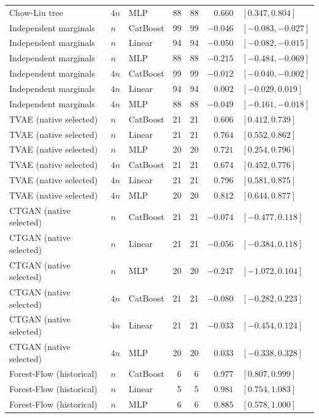 \begin{longtable}{@{}p{1.6in}llrrrl@{}}
Chow-Liu tree & $4n$ & MLP & 88 & 88 & $0.660$ & $[0.347, 0.804]$ \\
Independent marginals & $n$ & CatBoost & 99 & 99 & $-0.046$ & $[-0.083, -0.027]$ \\
Independent marginals & $n$ & Linear & 94 & 94 & $-0.050$ & $[-0.082, -0.015]$ \\
Independent marginals & $n$ & MLP & 88 & 88 & $-0.215$ & $[-0.484, -0.069]$ \\
Independent marginals & $4n$ & CatBoost & 99 & 99 & $-0.012$ & $[-0.040, -0.002]$ \\
Independent marginals & $4n$ & Linear & 94 & 94 & $0.002$ & $[-0.029, 0.019]$ \\
Independent marginals & $4n$ & MLP & 88 & 88 & $-0.049$ & $[-0.161, -0.018]$ \\
TVAE (native selected) & $n$ & CatBoost & 21 & 21 & $0.606$ & $[0.412, 0.739]$ \\
TVAE (native selected) & $n$ & Linear & 21 & 21 & $0.764$ & $[0.552, 0.862]$ \\
TVAE (native selected) & $n$ & MLP & 20 & 20 & $0.721$ & $[0.254, 0.796]$ \\
TVAE (native selected) & $4n$ & CatBoost & 21 & 21 & $0.674$ & $[0.452, 0.776]$ \\
TVAE (native selected) & $4n$ & Linear & 21 & 21 & $0.796$ & $[0.581, 0.875]$ \\
TVAE (native selected) & $4n$ & MLP & 20 & 20 & $0.812$ & $[0.644, 0.877]$ \\
CTGAN (native selected) & $n$ & CatBoost & 21 & 21 & $-0.074$ & $[-0.477, 0.118]$ \\
CTGAN (native selected) & $n$ & Linear & 21 & 21 & $-0.056$ & $[-0.384, 0.118]$ \\
CTGAN (native selected) & $n$ & MLP & 20 & 20 & $-0.247$ & $[-1.072, 0.104]$ \\
CTGAN (native selected) & $4n$ & CatBoost & 21 & 21 & $-0.080$ & $[-0.282, 0.223]$ \\
CTGAN (native selected) & $4n$ & Linear & 21 & 21 & $-0.033$ & $[-0.454, 0.124]$ \\
CTGAN (native selected) & $4n$ & MLP & 20 & 20 & $0.033$ & $[-0.338, 0.328]$ \\
Forest-Flow (historical) & $n$ & CatBoost & 6 & 6 & $0.977$ & $[0.807, 0.999]$ \\
Forest-Flow (historical) & $n$ & Linear & 5 & 5 & $0.981$ & $[0.754, 1.083]$ \\
Forest-Flow (historical) & $n$ & MLP & 6 & 6 & $0.885$ & $[0.578, 1.000]$ \\

\end{longtable}
